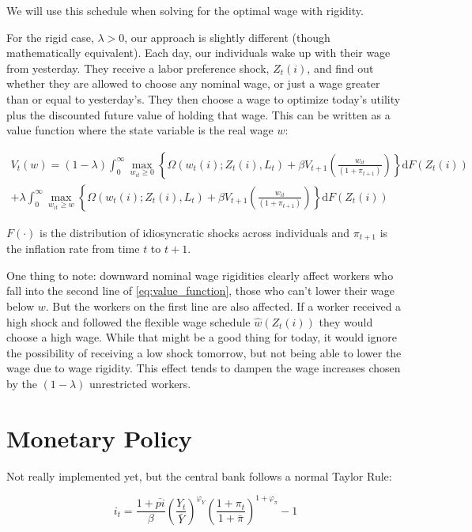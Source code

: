 \documentclass[12pt,a4paper]{scrartcl}            %
\begin{document}
We will use this schedule when solving for the optimal wage with rigidity.

For the rigid case, $\lambda > 0$, our approach is slightly different (though mathematically equivalent).
Each day, our individuals wake up with their wage from yesterday.
They receive a labor preference shock, $Z_t(i)$, and find out whether they are allowed to choose any nominal wage, or just a wage greater than or equal to yesterday's.
They then choose a wage to optimize today's utility plus the discounted future value of holding that wage.
This can be written as a value function where the state variable is the real wage $w$:

\begin{multline}
    \label{eq:value_function}
    V_t(w) = (1 - \lambda) \int_{0}^{\infty} \max_{w_{it} \geq 0} \left\{ \Omega( w_t(i); Z_t(i), L_t ) + \beta V_{t+1}\left( \frac{w_{it}}{(1 + \pi_{t+1})} \right) \right\} \mathrm{d}F(Z_t(i)) \\
                + \lambda  \int_{0}^{\infty} \max_{w_{it} \geq w} \left\{ \Omega( w_t(i); Z_t(i), L_t ) + \beta V_{t+1}\left( \frac{w_{it}}{(1 + \pi_{t+1})} \right) \right\} \mathrm{d}F(Z_t(i))
\end{multline}

$F(\cdot)$ is the distribution of idiosyncratic shocks across individuals and $\pi_{t+1}$ is the inflation rate from time $t$ to $t+1$.

One thing to note: downward nominal wage rigidities clearly affect workers who fall into the second line of \ref{eq:value_function}, those who can't lower their wage below $w$.
But the workers on the first line are also affected.
If a worker received a high shock and followed the flexible wage schedule $\hat{w}(Z_t(i))$ they would choose a high wage.
While that might be a good thing for today, it would ignore the possibility of receiving a low shock tomorrow, but not being able to lower the wage due to wage rigidity.
This effect tends to dampen the wage increases chosen by the $(1 - \lambda)$ unrestricted workers.

\section{Monetary Policy}
\label{sec:monetary_policy}

Not really implemented yet, but the central bank follows a normal Taylor Rule:

\begin{equation}
    \label{eq:taylor_rule}
    i_t = \frac{1 + \bar{pi}}{\beta} \left( \frac{Y_t}{\bar{Y}} \right)^{\varphi_Y} \left( \frac{1 + \pi_t}{1 + \bar{\pi}} \right)^{1 + \varphi_{\pi}} - 1
\end{equation}
\end{document}
